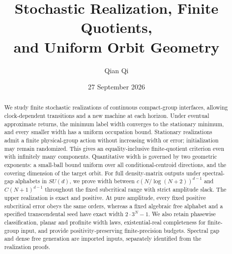 \documentclass[11pt]{amsart}
\title[Stochastic realization and orbit geometry]{Stochastic Realization, Finite Quotients,\\and Uniform Orbit Geometry}
\author{Qian Qi}
\date{27 September 2026}
\numberwithin{equation}{section}
\theoremstyle{definition}\newtheorem{definition}[theorem]{Definition}
\theoremstyle{remark}\newtheorem{remark}[theorem]{Remark}
\begin{document}
\begin{abstract}
We study finite stochastic realizations of continuous compact-group interfaces, allowing clock-dependent transitions and a new machine at each horizon. Under eventual approximate returns, the minimum label width converges to the stationary minimum, and every smaller width has a uniform occupation bound. Stationary realizations admit a finite physical-group action without increasing width or error; initialization may remain randomized. This gives an equality-inclusive finite-quotient criterion even with infinitely many components. Quantitative width is governed by two geometric exponents: a small-ball bound uniform over all conditional-centroid directions, and the covering dimension of the target orbit. For full density-matrix outputs under spectral-gap alphabets in $SU(d)$, we prove width between $c(N/\log(N+2))^{d-1}$ and $C(N+1)^{d-1}$ throughout the fixed subcritical range with strict amplitude slack. The upper realization is exact and positive. At pure amplitude, every fixed positive subcritical error obeys the same orders, whereas a fixed algebraic free alphabet and a specified transcendental seed have exact width $2\cdot3^N-1$. We also retain phasewise classification, planar and profinite width laws, existential-real completeness for finite-group input, and provide positivity-preserving finite-precision budgets. Spectral gap and dense free generation are imported inputs, separately identified from the realization proofs.
\end{abstract}
\maketitle




















\end{document}
